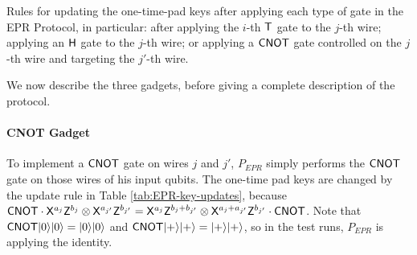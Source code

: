 \begin{table}[H]


\caption{Rules for updating the one-time-pad keys after applying each type of gate in the EPR Protocol, in particular: after applying the $i$-th $\sf T$ gate to the $j$-th wire; applying an $\sf H$ gate to the $j$-th wire; or applying a $\sf CNOT$ gate controlled on the $j$-th wire and targeting the $j'$-th wire. 
}\label{tab:EPR-key-updates}
\end{table}

We now describe the three gadgets, before giving a complete description of the protocol. 

\paragraph{CNOT Gadget} To implement a $\sf CNOT$ gate on wires $j$ and $j'$, $P_{EPR}$ simply performs the $\sf CNOT$ gate on those wires of his input qubits. The one-time pad keys are changed by the update rule in Table \ref{tab:EPR-key-updates}, because ${\sf CNOT}\cdot {\sf X}^{a_j}{\sf Z}^{b_j}\otimes {\sf X}^{a_{j'}}{\sf Z}^{b_{j'}}={\sf X}^{a_j}{\sf Z}^{b_j+b_{j'}}\otimes {\sf X}^{a_j+a_{j'}}{\sf Z}^{b_{j'}}\cdot {\sf CNOT}$. Note that ${\sf CNOT}|0\rangle|0\rangle=|0\rangle|0\rangle$ and ${\sf CNOT}|+\rangle|+\rangle=|+\rangle|+\rangle$, so in the test runs, $P_{EPR}$ is applying the identity. 



